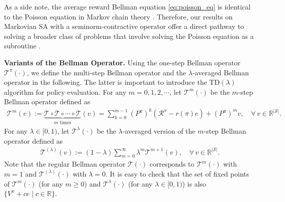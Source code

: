 \documentclass[11 pt]{article}
\begin{document}
	As a side note, the average reward Bellman equation \eqref{eq:poisson_eq} is identical to the Poisson equation in Markov chain theory \cite{meyn2012markov, douc2018markov}. Therefore, our results on Markovian SA with a seminorm-contractive operator offer a direct pathway to solving a broader class of problems that involve solving the Poisson equation as a subroutine \cite{agrawal2024markov, jure2018, douc2024solvingpoissonequationusing, henderson2002approximating}.
	
	\vspace{3 mm}
	\noindent\textbf{Variants of the Bellman Operator.} Using the one-step Bellman operator $\mathcal{T}^\pi(\cdot)$, we define the multi-step Bellman operator and the $\lambda$-averaged Bellman operator in the following. The latter is important to introduce the TD$(\lambda)$ algorithm for policy evaluation. For any $m=0,1,2,\cdots$, let $\mathcal{T}^{m}(\cdot)$ be the $m$-step Bellman operator defined as
	\begin{align*}
		\mathcal{T}^m(v) :=\underbrace{\mathcal{T}\circ \mathcal{T} \circ\cdots \circ\mathcal{T}}_{m \text{ times}} (v)
		=  \sum^{m-1}_{k=0} (P^\pi )^k (\mathcal{R}^\pi -r({\pi}) e ) + (P^\pi )^m v,\quad \forall\,v\in\mathbb{R}^{|\mathcal{S}|}.
	\end{align*}
	For any $\lambda\in [0,1)$, let $\mathcal{T}^\lambda(\cdot)$ be the $\lambda$-averaged version of the $m$-step Bellman operator defined as 
	\begin{align}\label{def:T_lambda}
		\mathcal{T}^{(\lambda)}(v) := (1-\lambda)\sum^{\infty}_{m=0}\lambda^{m} \mathcal{T}^{m+1} (v),\quad \forall\,v\in\mathbb{R}^{|\mathcal{S}|}.
	\end{align}
	Note that the regular Bellman operator $\mathcal{T}(\cdot)$ corresponds to $\mathcal{T}^m(\cdot)$ with $m=1$ and $\mathcal{T}^{(\lambda)}(\cdot)$ with $\lambda=0$.
	It is easy to check that the set of fixed points of $\mathcal{T}^m(\cdot)$ (for any $m\geq 0$) and $\mathcal{T}^\lambda(\cdot)$ (for any $\lambda\in [0,1)$) is also $\{V^{\pi} + ce \mid c \in \mathbb{R}\}$.
	
	
	
	
	
\end{document}
